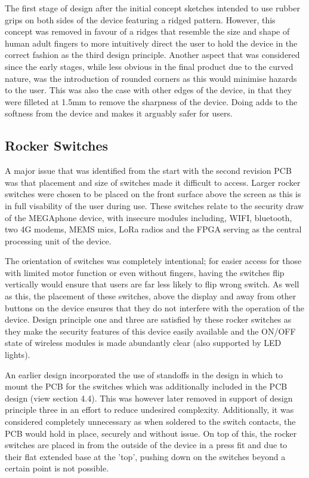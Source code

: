 The first stage of design after the initial concept sketches intended to use rubber grips on both sides of the device featuring a ridged pattern.
However, this concept was removed in favour of a ridges that resemble the size and shape of human adult fingers to more intuitively direct the user to hold the device in the correct fashion as the third design principle.
Another aspect that was considered since the early stages, while less obvious in the final product due to the curved nature, was the introduction of rounded corners as this would minimise hazards to the user.
This was also the case with other edges of the device, in that they were filleted at 1.5mm to remove the sharpness of the device.
Doing adds to the softness from the device and makes it arguably safer for users.


\subsection{Rocker Switches}

A major issue that was identified from the start with the second revision PCB was that placement and size of switches made it difficult to access.
Larger rocker switches were chosen to be placed on the front surface above the screen as this is in full visability of the user during use.
These switches relate to the security draw of the MEGAphone device, with insecure modules including, WIFI, bluetooth, two 4G modems, MEMS mics, LoRa radios and the FPGA serving as the central processing unit of the device.

The orientation of switches was completely intentional; for easier access for those with limited motor function or even without fingers, having the switches flip vertically would ensure that users are far less likely to flip wrong switch.
As well as this, the placement of these switches, above the display and away from other buttons on the device ensures that they do not interfere with the operation of the device.
Design principle one and three are satisfied by these rocker switches as they make the security features of this device easily available and the ON/OFF state of wireless modules is made abundantly clear (also supported by LED lights).

An earlier design incorporated the use of standoffs in the design in which to mount the PCB for the switches which was additionally included in the PCB design (view section 4.4). %
This was however later removed in support of design principle three in an effort to reduce undesired complexity.
Additionally, it was considered completely unnecessary as when soldered to the switch contacts, the PCB would hold in place, securely and without issue.
On top of this, the rocker switches are placed in from the outside of the device in a press fit and due to their flat extended base at the 'top', pushing down on the switches beyond a certain point is not possible.

